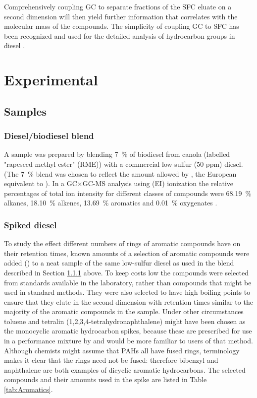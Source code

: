 Comprehensively coupling GC to separate fractions of the SFC eluate on a second
dimension will then yield further information that correlates with the molecular
mass of the compounds. The simplicity of coupling GC to SFC has been recognized
and used for the detailed analysis of hydrocarbon groups in diesel
\autocite{Pal1998}. 


\section{Experimental}

\subsection{Samples} 

\subsubsection{Diesel/biodiesel blend}
\label{sec:SampleBlend}
A sample was prepared by blending \SI{7}{\percent} of biodiesel from canola
(labelled "rapeseed methyl ester" (RME)) with a commercial low-sulfur (50 ppm)
diesel. (The \SI{7}{\percent} blend was chosen to reflect the amount allowed by
, the European equivalent to ). In a GC×GC-MS analysis
using  (EI) ionization the relative percentages of
total ion intensity for different classes of compounds were \SI{68.19}{\percent}
alkanes, \SI{18.10}{\percent} alkenes, \SI{13.69}{\percent} aromatics and
\SI{0.01}{\percent} oxygenates \autocite{Smit2015}.

\subsubsection{Spiked diesel}
To study the effect different numbers of rings of aromatic compounds have on
their retention times, known amounts of a selection of aromatic compounds were
added () to a neat sample of the same low-sulfur diesel as used
in the blend described in Section \ref{sec:SampleBlend} above. To keep costs low
the compounds were selected from standards available in the laboratory, rather
than compounds that might be used in standard methods. They were also selected
to have high boiling points to ensure that they elute in the second dimension
with retention times similar to the majority of the aromatic compounds in the
sample. Under other circumstances toluene and tetralin
(1,2,3,4-tetrahydronaphthalene) might have been chosen as the monocyclic
aromatic hydrocarbon spikes, because these are prescribed for use in a
performance mixture by  and would be more familiar to users of
that method. Although chemists might assume that PAHs all have fused rings,
 terminology makes it clear that the rings need not be fused:
therefore bibenzyl and naphthalene are both examples of dicyclic aromatic
hydrocarbons. The selected compounds and their amounts used in the spike are
listed in Table \ref{tab:Aromatics}.

